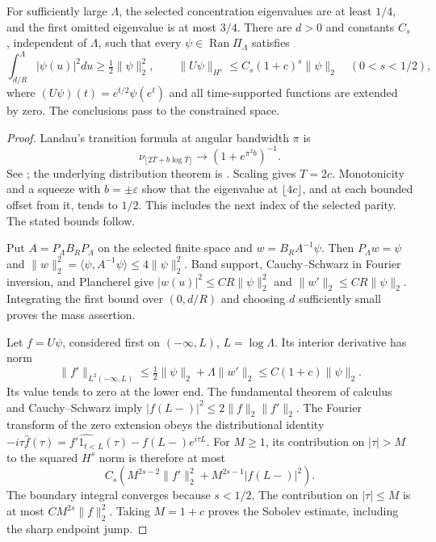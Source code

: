 \begin{lemma}\label{lem:raw-estimates}
For sufficiently large $\Lambda$, the selected concentration eigenvalues
are at least $1/4$, and the first omitted eigenvalue is at most $3/4$.
There are $d>0$ and constants $C_s$, independent of $\Lambda$, such that
every $\psi\in\operatorname{Ran}\Pi_\Lambda$ satisfies
\[
 \int_{d/R}^\Lambda|\psi(u)|^2du\geq\tfrac12\|\psi\|_2^2,
 \qquad \|U\psi\|_{H^s}\leq C_s(1+c)^s\|\psi\|_2
 \quad(0<s<1/2),
\]
where $(U\psi)(t)=e^{t/2}\psi(e^t)$ and all time-supported functions
are extended by zero. The conclusions pass to the constrained space.
\end{lemma}
\begin{proof}
Landau's transition formula at angular bandwidth $\pi$ is
\[
 \nu_{\lfloor2T+b\log T\rfloor}\longrightarrow
                    (1+e^{\pi^2b})^{-1}.
\]
See \citet[pp.~209, 211]{landau1985}; the underlying distribution
theorem is \citet{landauwidom1980}. Scaling gives $T=2c$.
Monotonicity and a squeeze with $b=\pm\varepsilon$ show that the
eigenvalue at $\lfloor4c\rfloor$, and at each bounded offset from it,
tends to $1/2$. This includes the next index of the selected parity.
The stated bounds follow.

Put $A=P_\Lambda B_RP_\Lambda$ on the selected finite space and
$w=B_RA^{-1}\psi$. Then $P_\Lambda w=\psi$ and
$\|w\|_2^2=\langle\psi,A^{-1}\psi\rangle\leq4\|\psi\|_2^2$.
Band support, Cauchy--Schwarz in Fourier inversion, and Plancherel
give $|w(u)|^2\leq C R\|\psi\|_2^2$ and
$\|w'\|_2\leq C R\|\psi\|_2$.
Integrating the first bound over $(0,d/R)$ and choosing $d$ sufficiently
small proves the mass assertion.

Let $f=U\psi$, considered first on $(-\infty,L)$,
$L=\log\Lambda$. Its interior derivative has norm
\[
 \|f'\|_{L^2(-\infty,L)}
 \leq\tfrac12\|\psi\|_2+\Lambda\|w'\|_2
 \leq C(1+c)\|\psi\|_2.
\]
Its value tends to zero at the lower end. The fundamental theorem
of calculus and Cauchy--Schwarz imply
$|f(L-)|^2\leq2\|f\|_2\|f'\|_2$.
The Fourier transform of the zero extension obeys the distributional
identity $-i\tau\widehat f(\tau)=\widehat{f'1_{t<L}}(\tau)
-f(L-)e^{i\tau L}$. For $M\geq1$, its contribution on $|\tau|>M$
to the squared $H^s$ norm is therefore at most
\[
 C_s\left(M^{2s-2}\|f'\|_2^2+
                    M^{2s-1}|f(L-)|^2\right).
\]
The boundary integral converges because $s<1/2$.
The contribution on $|\tau|\leq M$ is at most
$C M^{2s}\|f\|_2^2$. Taking $M=1+c$ proves the Sobolev estimate,
including the sharp endpoint jump.
\end{proof}

